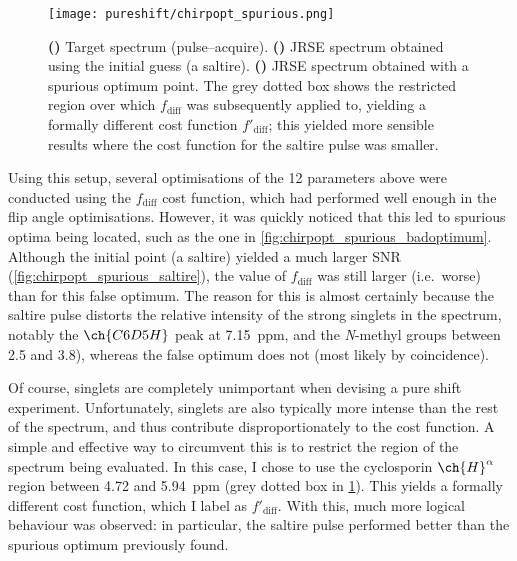 \begin{figure}[htbp]
    \centering
    \texttt{[image: pureshift/chirpopt\_spurious.png]}%
    {\label{fig:chirpopt_spurious_target}}%
    {\label{fig:chirpopt_spurious_saltire}}%
    {\label{fig:chirpopt_spurious_badoptimum}}%
    \caption[Spurious optimum obtained in waveform optimisation using $f_\text{diff}$]{
        \textbf{()} Target spectrum (pulse--acquire).
        \textbf{()} JRSE spectrum obtained using the initial guess (a saltire).
        \textbf{()} JRSE spectrum obtained with a spurious optimum point.
        The grey dotted box shows the restricted region over which $f_\text{diff}$ was subsequently applied to, yielding a formally different cost function $f'_\text{diff}$; this yielded more sensible results where the cost function for the saltire pulse was smaller.
    }
    \label{fig:chirpopt_spurious}
\end{figure}

Using this setup, several optimisations of the 12 parameters above were conducted using the $f_\text{diff}$ cost function, which had performed well enough in the flip angle optimisations.
However, it was quickly noticed that this led to spurious optima being located, such as the one in \cref{fig:chirpopt_spurious_badoptimum}.
Although the initial point (a saltire) yielded a much larger SNR (\cref{fig:chirpopt_spurious_saltire}), the value of $f_\text{diff}$ was still larger (i.e.\ worse) than for this false optimum.
The reason for this is almost certainly because the saltire pulse distorts the relative intensity of the strong singlets in the spectrum, notably the $\ch{C6D5H}$ peak at \qty{7.15}{ppm}, and the \textit{N}-methyl groups between 2.5 and \qty{3.8}{\ppm}), whereas the false optimum does not (most likely by coincidence).

Of course, singlets are completely unimportant when devising a pure shift experiment.
Unfortunately, singlets are also typically more intense than the rest of the spectrum, and thus contribute disproportionately to the cost function.
A simple and effective way to circumvent this is to restrict the region of the spectrum being evaluated.
In this case, I chose to use the cyclosporin $\ch{H}^{\alpha}$ region between 4.72 and \qty{5.94}{ppm} (grey dotted box in \cref{fig:chirpopt_spurious}).
This yields a formally different cost function, which I label as $f'_\text{diff}$.
With this, much more logical behaviour was observed: in particular, the saltire pulse performed better than the spurious optimum previously found.

